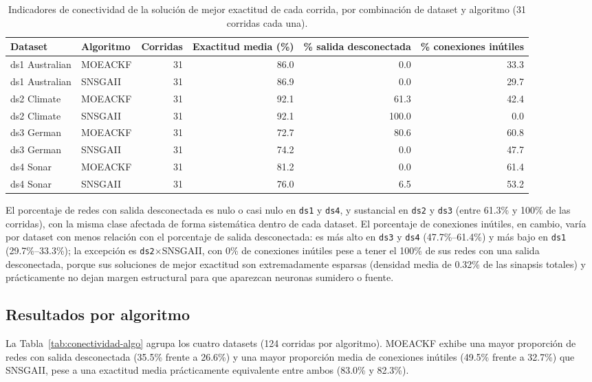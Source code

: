 \begin{table}[htbp]
\centering
\small
\caption{Indicadores de conectividad de la solución de mejor exactitud de cada corrida, por combinación de dataset y algoritmo (31 corridas cada una).}
\label{tab:conectividad-combo}
\begin{tabular}{llrrrr}
\toprule
Dataset & Algoritmo & Corridas & Exactitud media (\%) & \% salida desconectada & \% conexiones inútiles \\
\midrule
ds1 Australian & MOEACKF & 31 & 86.0 & 0.0   & 33.3 \\
ds1 Australian & SNSGAII & 31 & 86.9 & 0.0   & 29.7 \\
ds2 Climate    & MOEACKF & 31 & 92.1 & 61.3  & 42.4 \\
ds2 Climate    & SNSGAII & 31 & 92.1 & 100.0 & 0.0  \\
ds3 German     & MOEACKF & 31 & 72.7 & 80.6  & 60.8 \\
ds3 German     & SNSGAII & 31 & 74.2 & 0.0   & 47.7 \\
ds4 Sonar      & MOEACKF & 31 & 81.2 & 0.0   & 61.4 \\
ds4 Sonar      & SNSGAII & 31 & 76.0 & 6.5   & 53.2 \\
\bottomrule
\end{tabular}
\end{table}

El porcentaje de redes con salida desconectada es nulo o casi nulo en \texttt{ds1} y \texttt{ds4}, y sustancial en \texttt{ds2} y \texttt{ds3} (entre 61.3\% y 100\% de las corridas), con la misma clase afectada de forma sistemática dentro de cada dataset. El porcentaje de conexiones inútiles, en cambio, varía por dataset con menos relación con el porcentaje de salida desconectada: es más alto en \texttt{ds3} y \texttt{ds4} (47.7\%--61.4\%) y más bajo en \texttt{ds1} (29.7\%--33.3\%); la excepción es \texttt{ds2}$\times$SNSGAII, con 0\% de conexiones inútiles pese a tener el 100\% de sus redes con una salida desconectada, porque sus soluciones de mejor exactitud son extremadamente esparsas (densidad media de 0.32\% de las sinapsis totales) y prácticamente no dejan margen estructural para que aparezcan neuronas sumidero o fuente.

\subsection{Resultados por algoritmo}
\label{sec:conectividad-resultados-algo}

La Tabla~\ref{tab:conectividad-algo} agrupa los cuatro datasets (124 corridas por algoritmo). MOEACKF exhibe una mayor proporción de redes con salida desconectada (35.5\% frente a 26.6\%) y una mayor proporción media de conexiones inútiles (49.5\% frente a 32.7\%) que SNSGAII, pese a una exactitud media prácticamente equivalente entre ambos (83.0\% y 82.3\%).


